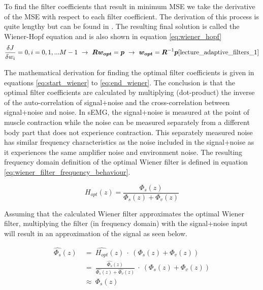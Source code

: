 To find the filter coefficients that result in minimum MSE we take the derivative of the MSE with respect to each filter coefficient. The derivation of this process is quite lengthy but can be found in \cite{proakis_manolakis_1996}. The resulting final solution is called the Wiener-Hopf equation \cite{lecture_adaptive_filters_1} and is also shown in equation \ref{eq:wiener_hopf}
\begin{equation}\label{eq:end_wiener}
    \frac{\delta J}{\delta w_i} = 0, i = 0, 1, ... M-1 \ \rightarrow \ \boldsymbol{R} \boldsymbol{w_{opt}} = \boldsymbol{p} \ \rightarrow \ \boldsymbol{w_{opt}} = \boldsymbol{R}^{-1}\boldsymbol{p} \text{\cite{lecture_adaptive_filters_1}}
\end{equation}


The mathematical derivation for finding the optimal filter coefficients is given in equations \ref{eq:start_wiener} to \ref{eq:end_wiener}. The conclusion is that the optimal filter coefficients are calculated by multiplying (dot-product) the inverse of the auto-correlation of signal+noise and the cross-correlation between signal+noise and noise. In sEMG, the signal+noise is measured at the point of muscle contraction while the noise can be measured separately from a different body part that does not experience contraction. This separately measured noise has similar frequency characteristics as the noise included in the signal+noise as it experiences the same amplifier noise and environment noise. The resulting frequency domain definition of the optimal Wiener filter is defined in equation \ref{eq:wiener_filter_frequency_behaviour}\cite{stanford_wiener_filter}.

\begin{equation}
    H_{opt}(z) = \frac{\Phi_{s}(z)}{\Phi_{s}(z) + \Phi_{v}(z)}
    \label{eq:wiener_filter_frequency_behaviour}
\end{equation}

Assuming that the calculated Wiener filter approximates the optimal Wiener filter, multiplying the filter (in frequency domain) with the signal+noise input will result in an approximation of the signal as seen below.

\begin{align}
    \hat{\Phi_{s}}(z) & \ = \ \hat{H_{opt}}(z) \ \cdot \ (\Phi_{s}(z) + \Phi_{v}(z)) \label{eq:wiener_filter_frequency_application_1} \\
    & \ = \ \frac{\hat{\Phi_{s}}(z)}{\hat{\Phi_{s}}(z) + \hat{\Phi_{v}}(z)} \ \cdot \ (\Phi_{s}(z) + \Phi_{v}(z)) \label{eq:wiener_filter_frequency_application_2}\\
    & \ \approx \ \Phi_{s}(z) \label{eq:wiener_filter_frequency_application_3}
\end{align}

